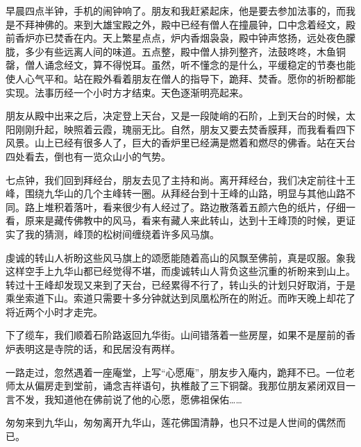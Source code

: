 早晨四点半钟，手机的闹钟响了。朋友和我赶紧起床，他是要去参加法事的，而我是不拜神佛的。来到大雄宝殿之外，殿中已经有僧人在撞晨钟，口中念着经文，殿前香炉亦已焚香在内。天上繁星点点，炉内香烟袅袅，殿中钟声悠扬，远处夜色朦胧，多少有些远离人间的味道。五点整，殿中僧人排列整齐，法鼓咚咚，木鱼铜罄，僧人诵念经文，算不得悦耳。虽然，听不懂念的是什么，平缓稳定的节奏也能使人心气平和。站在殿外看着朋友在僧人的指导下，跪拜、焚香。愿你的祈盼都能实现。法事历经一个小时方才结束。天色逐渐明亮起来。

朋友从殿中出来之后，决定登上天台，又是一段陡峭的石阶，上到天台的时候，太阳刚刚升起，映照着云霞，瑰丽无比。自然，朋友又要去焚香膜拜，而我看看四下风景。山上已经有很多人了，巨大的香炉里已经满是燃着和燃尽的佛香。站在天台四处看去，倒也有一览众山小的气势。

七点钟，我们回到拜经台，朋友去见了主持和尚。离开拜经台，我们决定前往十王峰，围绕九华山的几个主峰转一圈。从拜经台到十王峰的山路，明显与其他山路不同。路上堆积着落叶，看来很少有人经过了。路边散落着五颜六色的纸片，仔细一看，原来是藏传佛教中的风马，看来有藏人来此转山，达到十王峰顶的时候，更证实了我的猜测，峰顶的松树间缠绕着许多风马旗。

虔诚的转山人祈盼这些风马旗上的颂愿能随着高山的风飘至佛前，真是叹服。象我这样空手上九华山都已经觉得不堪，而虔诚转山人背负这些沉重的祈盼来到山上。转过十王峰却发现又来到了天台，已经累得不行了，转山头的计划只好取消，于是乘坐索道下山。索道只需要十多分钟就达到凤凰松所在的附近。而昨天晚上却花了将近两个小时才走完。

下了缆车，我们顺着石阶路返回九华街。山间错落着一些房屋，如果不是屋前的香炉表明这是寺院的话，和民居没有两样。

一路走过，忽然遇着一座庵堂，上写“心愿庵”，朋友步入庵内，跪拜不已。一位老师太从偏房走到堂前，诵念吉祥语句，执椎敲了三下铜罄。我那位朋友紧闭双目一言不发，我知道他在佛前说了他的心愿，愿佛祖保佑……

匆匆来到九华山，匆匆离开九华山，莲花佛国清静，也只不过是人世间的偶然而已。
